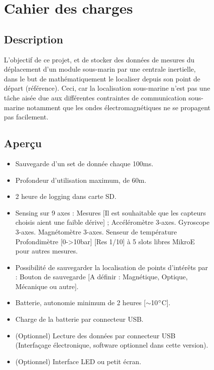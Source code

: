 \begin{figure}

\hfill


\begin{minipage}{1\textwidth}
\section{Cahier des charges}

\subsection{Description}
L’objectif de ce projet, et de stocker des données de mesures du déplacement d’un module sous-marin par une centrale inertielle, dans le but de mathématiquement le localiser depuis son point de départ (référence). Ceci, car la localisation sous-marine n’est pas une tâche aisée due aux différentes contraintes de communication sous-marine notamment que les ondes électromagnétiques ne se propagent pas facilement.
\end{minipage}

\begin{minipage}{1\textwidth}


\subsection{Aperçu}
    \begin{itemize}
        \item	Sauvegarde d’un set de donnée chaque 100ms.
        \item	Profondeur d’utilisation maximum, de 60m.
        \item	2 heure de logging dans carte SD.
        \item	Sensing sur 9 axes :
        \subitem Mesures [Il est souhaitable que les capteurs choisis aient une faible dérive] ;
        \subsubitem Accéléromètre 3-axes. 
        \subsubitem	Gyroscope 3-axes.
        \subsubitem	Magnétomètre 3-axes. 
        \subsubitem	Senseur de température
        \subsubitem	Profondimètre [0->10bar] [Res 1/10]
         à 5 slots libres MikroE pour autres mesures. 
        \item Possibilité de sauvegarder la localisation de points d’intérêts par :
        \subitem Bouton de sauvegarde [A définir : Magnétique, Optique, Mécanique ou autre].
        \item Batterie, autonomie minimum de 2 heures [$\sim$10$\degree$C].
        \item Charge de la batterie par connecteur USB.
        \item (Optionnel) Lecture des données par connecteur USB (Interfaçage électronique, software optionnel dans cette version).
        \item (Optionnel) Interface LED ou petit écran.\\
    \end{itemize}


\end{minipage}

\end{figure}


